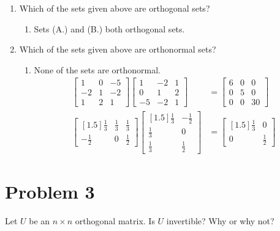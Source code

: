 \documentclass[letter,11pt]{article}
\theoremstyle{definition}
\begin{document}
\begin{enumerate}[label = \roman*.]
    \item Which of the sets given above are orthogonal sets?
        \begin{enumerate}
            \item Sets (A.) and (B.) both orthogonal sets.
        \end{enumerate}
    \item Which of the sets given above are orthonormal sets?
    \begin{enumerate}
        \item None of the sets are orthonormal. 
        \begin{align}
            \begin{bmatrix} 1 & 0 & -5 \\ -2 & 1 & -2 \\ 1 & 2 & 1 \end{bmatrix}\begin{bmatrix} 1 & -2 & 1 \\ 0 & 1 & 2 \\ -5 & -2 & 1 \end{bmatrix} &=  \begin{bmatrix} 6 & 0 & 0 \\ 0 & 5 & 0 \\ 0 & 0 & 30 \end{bmatrix}\\
            \begin{bmatrix}[1.5] \frac{1}{3} & \frac{1}{3} & \frac{1}{3} \\ -\frac{1}{2} & 0 & \frac{1}{2} \end{bmatrix} \begin{bmatrix}[1.5] \frac{1}{3} & -\frac{1}{2} \\ \frac{1}{3} & 0 \\ \frac{1}{3} & \frac{1}{2} \end{bmatrix} &= \begin{bmatrix}[1.5] \frac{1}{3} & 0 \\ 0 & \frac{1}{2} \end{bmatrix}
        \end{align}
    \end{enumerate}
\end{enumerate}

\section{Problem 3}
Let $U$ be an $n \times n$ orthogonal matrix. Is $U$ invertible? Why or why not?
\end{document}
